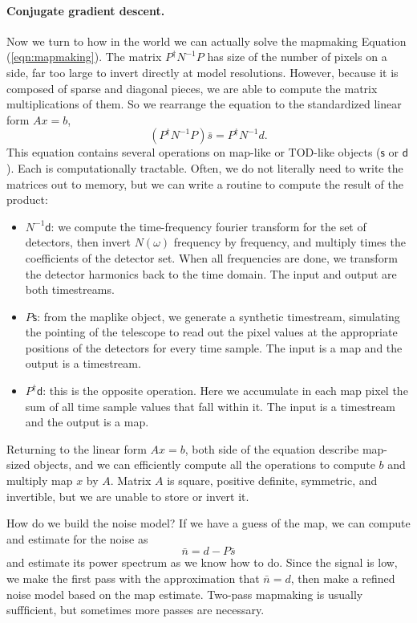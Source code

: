 \paragraph{Conjugate gradient descent.}  Now we turn to how in the world we can actually solve the mapmaking Equation (\ref{eqn:mapmaking}).  The matrix $P^\dag N^{-1} P$ has size of the number of pixels on a side, far too large to invert directly at model resolutions.  However, because it is composed of sparse and diagonal pieces, we are able to compute the matrix multiplications of them.  So we rearrange the equation to the standardized linear form $Ax = b$,
\begin{equation}
  (P^\dag N^{-1}P) \bar s = P^\dag N^{-1}d.
\end{equation}
This equation contains several operations on map-like or TOD-like objects ($\mathsf{s}$ or $\mathsf{d}$). Each is computationally tractable.  Often, we do not literally need to write the matrices out to memory, but we can write a routine to compute the result of the product:
\begin{itemize}
\item $N^{-1} \mathsf{d}$: we compute the time-frequency fourier transform for the set of detectors, then invert $N(\omega)$ frequency by frequency, and multiply times the coefficients of the detector set.  When all frequencies are done, we transform the detector harmonics back to the time domain.  The input and output are both timestreams.
\item $P \mathsf{s}$: from the maplike object, we generate a synthetic timestream, simulating the pointing of the telescope to read out the pixel values at the appropriate positions of the detectors for every time sample.  The input is a map and the output is a timestream.
\item $P^\dag \mathsf{d}$: this is the opposite operation.  Here we accumulate in each map pixel the sum of all time sample values that fall within it.  The input is a timestream and the output is a map.
\end{itemize}

Returning to the linear form $Ax = b$, both side of the equation describe map-sized objects, and we can efficiently compute all the operations to compute $b$ and multiply map $x$ by $A$.  Matrix $A$ is square, positive definite, symmetric, and invertible, but we are unable to store or invert it.


How do we build the noise model?  If we have a guess of the map, we can compute and estimate for the noise as
\begin{equation}
  \bar n = d - P \bar s
\end{equation}
and estimate its power spectrum as we know how to do.
Since the signal is low, we make the first pass with the approximation that $\bar n = d$, then make a refined noise model based on the map estimate. Two-pass mapmaking is usually suffficient, but sometimes more passes are necessary.

